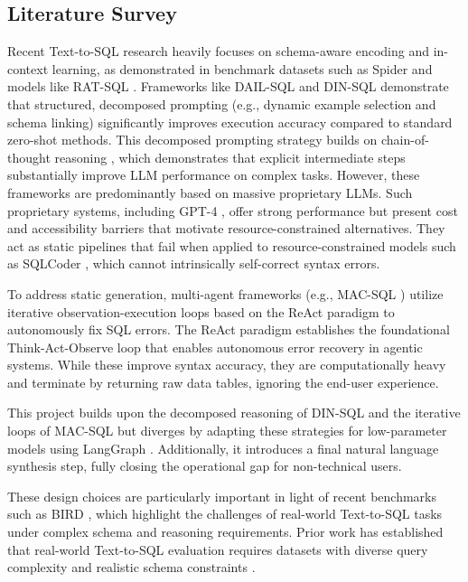 \documentclass{article}
\begin{document}
\subsection{Literature Survey}

Recent Text-to-SQL research heavily focuses on schema-aware encoding and in-context learning, as demonstrated in benchmark datasets such as Spider \cite{spider2018} and models like RAT-SQL \cite{ratsql2020}. Frameworks like DAIL-SQL \cite{gao2024dail} and DIN-SQL \cite{pourreza2023din} demonstrate that structured, decomposed prompting (e.g., dynamic example selection and schema linking) significantly improves execution accuracy compared to standard zero-shot methods. This decomposed prompting strategy builds on chain-of-thought reasoning \cite{wei2022cot}, which demonstrates that explicit intermediate steps substantially improve LLM performance on complex tasks. However, these frameworks are predominantly based on massive proprietary LLMs. Such proprietary systems, including GPT-4 \cite{openai2023gpt4}, offer strong performance but present cost and accessibility barriers that motivate resource-constrained alternatives. They act as static pipelines that fail when applied to resource-constrained models such as SQLCoder \cite{defog2023sqlcoder}, which cannot intrinsically self-correct syntax errors.

To address static generation, multi-agent frameworks (e.g., MAC-SQL \cite{wang2023macsql}) utilize iterative observation-execution loops based on the ReAct paradigm to autonomously fix SQL errors. The ReAct paradigm \cite{yao2023react} establishes the foundational Think-Act-Observe loop that enables autonomous error recovery in agentic systems. While these improve syntax accuracy, they are computationally heavy and terminate by returning raw data tables, ignoring the end-user experience.

This project builds upon the decomposed reasoning of DIN-SQL and the iterative loops of MAC-SQL but diverges by adapting these strategies for low-parameter models using LangGraph \cite{langchain2024langgraph}. Additionally, it introduces a final natural language synthesis step, fully closing the operational gap for non-technical users.

These design choices are particularly important in light of recent benchmarks such as BIRD \cite{li2023bird}, which highlight the challenges of real-world Text-to-SQL tasks under complex schema and reasoning requirements. Prior work has established that real-world Text-to-SQL evaluation requires datasets with diverse query complexity and realistic schema constraints \cite{katsogiannis2023survey}.
\end{document}
